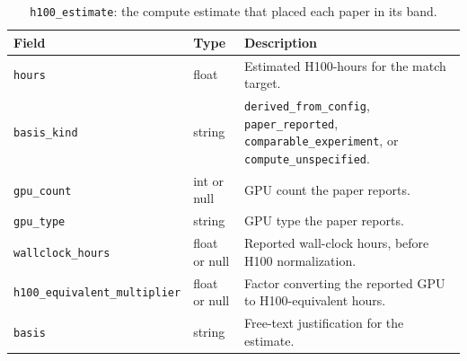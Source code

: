 \begin{table}[t]
\caption{\texttt{h100\_estimate}: the compute estimate that placed each paper
in its band.}
\label{tab:schema-h100}
\begin{center}
\footnotesize
\begin{tabular}{@{}llp{7.6cm}@{}}
\toprule
Field & Type & Description \\
\midrule
\texttt{hours} & float & Estimated H100-hours for the match target. \\
\texttt{basis\_kind} & string & \texttt{derived\_from\_config}, \texttt{paper\_reported}, \texttt{comparable\_experiment}, or \texttt{compute\_unspecified}. \\
\texttt{gpu\_count} & int or null & GPU count the paper reports. \\
\texttt{gpu\_type} & string & GPU type the paper reports. \\
\texttt{wallclock\_hours} & float or null & Reported wall-clock hours, before H100 normalization. \\
\texttt{h100\_equivalent\_multiplier} & float or null & Factor converting the reported GPU to H100-equivalent hours. \\
\texttt{basis} & string & Free-text justification for the estimate. \\
\bottomrule
\end{tabular}
\end{center}
\end{table}
